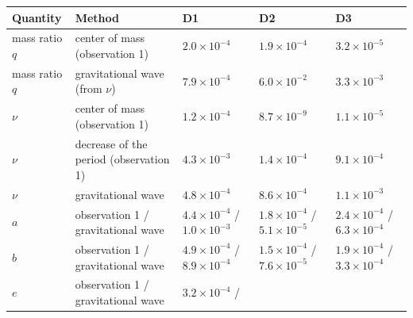 \documentclass[
  a4paper,
]{article}
\newcounter{none} %
\begin{document}
{\def\LTcaptype{none} %
\begin{longtable}[]{@{}
  >{\raggedright\arraybackslash}p{}
  >{\raggedright\arraybackslash}p{}
  >{\raggedright\arraybackslash}p{}
  >{\raggedright\arraybackslash}p{}
  >{\raggedright\arraybackslash}p{}@{}}
\toprule\noalign{}
\begin{minipage}[b]{\linewidth}\raggedright
Quantity
\end{minipage} & \begin{minipage}[b]{\linewidth}\raggedright
Method
\end{minipage} & \begin{minipage}[b]{\linewidth}\raggedright
D1
\end{minipage} & \begin{minipage}[b]{\linewidth}\raggedright
D2
\end{minipage} & \begin{minipage}[b]{\linewidth}\raggedright
D3
\end{minipage} \\
\midrule\noalign{}
\endhead
\bottomrule\noalign{}
\endlastfoot
mass ratio \(q\) & center of mass (observation 1) & \(2.0\times10^{-4}\)
& \(1.9\times10^{-4}\) & \(3.2\times10^{-5}\) \\
mass ratio \(q\) & gravitational wave (from \(\nu\)) &
\(7.9\times10^{-4}\) & \(6.0\times10^{-2}\) & \(3.3\times10^{-3}\) \\
\(\nu\) & center of mass (observation 1) & \(1.2\times10^{-4}\) &
\(8.7\times10^{-9}\) & \(1.1\times10^{-5}\) \\
\(\nu\) & decrease of the period (observation 1) & \(4.3\times10^{-3}\)
& \(1.4\times10^{-4}\) & \(9.1\times10^{-4}\) \\
\(\nu\) & gravitational wave & \(4.8\times10^{-4}\) &
\(8.6\times10^{-4}\) & \(1.1\times10^{-3}\) \\
\(a\) & observation 1 / gravitational wave & \(4.4\times10^{-4}\) /
\(1.0\times10^{-3}\) & \(1.8\times10^{-4}\) / \(5.1\times10^{-5}\) &
\(2.4\times10^{-4}\) / \(6.3\times10^{-4}\) \\
\(b\) & observation 1 / gravitational wave & \(4.9\times10^{-4}\) /
\(8.9\times10^{-4}\) & \(1.5\times10^{-4}\) / \(7.6\times10^{-5}\) &
\(1.9\times10^{-4}\) / \(3.3\times10^{-4}\) \\
\(e\) & observation 1 / gravitational wave & \(3.2\times10^{-4}\) /

\end{longtable}}
\end{document}
